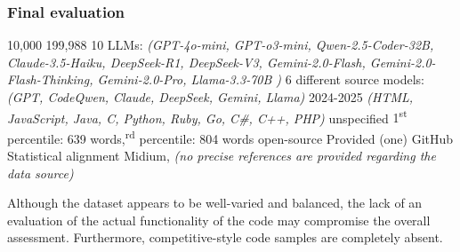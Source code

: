 \subsubsection*{Final evaluation}


\expandafter\def\csname CodeMirageHumanCode\endcsname{10,000}
\expandafter\def\csname CodeMirageLLMCode\endcsname{199,988}
\expandafter\def\csname CodeMirageNumLLMs\endcsname{10 LLMs: \textit{(GPT-4o-mini, GPT-o3-mini, Qwen-2.5-Coder-32B, Claude-3.5-Haiku, DeepSeek-R1, DeepSeek-V3,  Gemini-2.0-Flash,  Gemini-2.0-Flash-Thinking, Gemini-2.0-Pro, Llama-3.3-70B )}}
\expandafter\def\csname CodeMirageLLMDiversity\endcsname{6 different source models: \textit{(GPT, CodeQwen, Claude, DeepSeek, Gemini, Llama) }}
\expandafter\def\csname CodeMirageCurrentUse\endcsname{2024-2025}
\expandafter\def\csname CodeMirageLanguages\endcsname{\textit{(HTML, JavaScript, Java, C, Python, Ruby, Go, C\#, C++, PHP)}}
\expandafter\def\csname CodeMirageCodeTypes\endcsname{unspecified}
\expandafter\def\csname CodeMirageCodeSize\endcsname{1\textsuperscript{st} percentile: 639 words,\textsuperscript{rd} percentile: 804  words}
\expandafter\def\csname CodeMirageCodeContext\endcsname{open-source}
\expandafter\def\csname CodeMiragePrompts\endcsname{Provided (one)}
\expandafter\def\csname CodeMirageSources\endcsname{GitHub}
\expandafter\def\csname CodeMirageCodeQuality\endcsname{Statistical alignment}
\expandafter\def\csname CodeMirageReliability\endcsname{Midium, \textit{(no precise references are provided regarding the data source)}}




Although the dataset appears to be well-varied and balanced, 
the lack of an evaluation of the actual functionality of the code 
may compromise the overall assessment. Furthermore, 
competitive-style code samples are completely absent.
